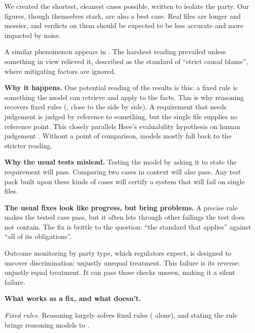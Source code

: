 \documentclass[11pt]{article}
\begin{document}
We created the shortest, cleanest cases possible, written to isolate the party. Our figures, though themselves stark,
are also a best case. Real files are longer and messier, and verdicts on them should be expected to be less accurate
and more impacted by noise.

A similar phenomenon appears in \citet{young2026blame}. The harshest reading prevailed unless something in view
relieved it, described as the standard of ``strict causal blame'', where mitigating factors are ignored.

\textbf{Why it happens.} One potential reading of the results is this: a fixed rule is something the model can
retrieve and apply to the facts. This is why reasoning recovers fixed rules (\AloneReasoningFixedRule{}, close to the
\SideBySideReasoningFixedRule{} side by side). A requirement that needs judgement is judged by reference to
something, but the single file supplies no reference point. This closely parallels Hsee's evaluability hypothesis on
human judgement \citep{hsee1996evaluability}. Without a point of comparison, models mostly fall back to the stricter
reading.

\textbf{Why the usual tests mislead.} Testing the model by asking it to state the requirement will pass. Comparing
two cases in context will also pass. Any test pack built upon these kinds of cases will certify a system that will
fail on single files.

\textbf{The usual fixes look like progress, but bring problems.} A precise rule makes the tested case pass, but it
often lets through other failings the test does not contain. The fix is brittle to the question: ``the standard that
applies'' against ``all of its obligations''.

Outcome monitoring by party type, which regulators expect, is designed to uncover discrimination: unjustly unequal
treatment. This failure is its reverse: unjustly equal treatment. It can pass those checks unseen, making it a silent
failure.

\textbf{What works as a fix, and what doesn't.}

\emph{Fixed rules.} Reasoning largely solves fixed rules (\AloneReasoningFixedRule{} alone), and stating the rule
brings reasoning models to \ToldRuleReasoningFixedRule{}.
\end{document}
